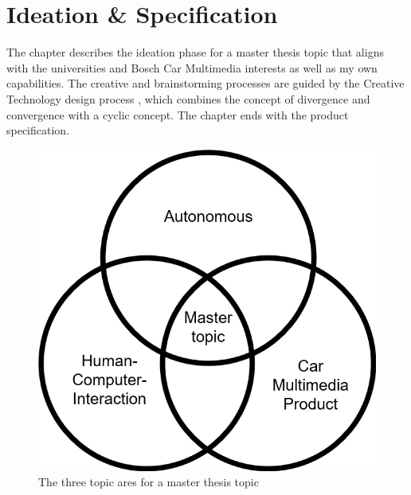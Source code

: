 \chapter{Ideation \& Specification}
\label{ch:ideation}
The chapter describes the ideation phase for a master thesis topic that aligns with the universities and Bosch Car Multimedia interests as well as my own capabilities. The creative and brainstorming processes are guided by the Creative Technology design process \cite{Mader2014ATechnology}, which combines the concept of divergence and convergence with a cyclic concept. The chapter ends with the product specification.

\begin{figure}
    \includegraphics[height=0.4\textwidth]{fig/MasterTopic.png}
    \caption[Workshop]{The three topic ares for a master thesis topic}
    \label{fig:mastertopic}
\end{figure}

